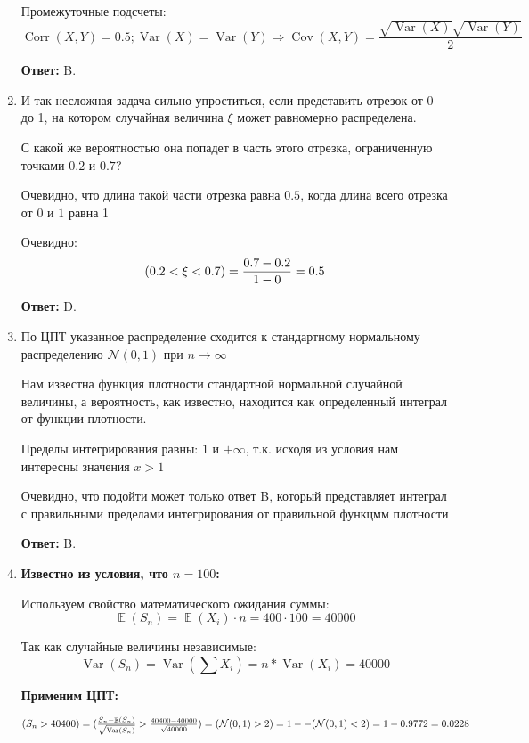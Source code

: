 \documentclass[a4paper]{article} %
\DeclareMathOperator{\Var}{Var}
\DeclareMathOperator{\Cov}{Cov}
\DeclareMathOperator{\Corr}{Corr}
\DeclareMathOperator{\E}{\mathbb{E}}
\let\P\relax
\DeclareMathOperator{\P}{\mathbb{P}}
\newcommand{\cN}{\mathcal{N}}
\begin{document}
\begin{enumerate}
    
    Промежуточные подсчеты: 
    \[\Corr(X,Y) = 0.5; \Var(X) = \Var(Y) \Rightarrow \Cov(X,Y) = \frac{\sqrt{\Var(X)}\sqrt{\Var(Y)}}{2} \]
    
    \textbf{Ответ:} B.
    
    
    \item
    И так несложная задача сильно упроститься, если представить отрезок от 0 до 1, на котором случайная величина $\xi$ может равномерно распределена. 
    
    С какой же вероятностью она попадет в часть этого отрезка, ограниченную точками $0.2$ и $0.7$?
    
    Очевидно, что длина такой части отрезка равна $0.5$, когда длина всего отрезка от $0$ и $1$ равна 1
    
    Очевидно: 
    \[\P(0.2 < \xi < 0.7) = \frac{0.7 - 0.2}{1 - 0} = 0.5 \]
    
    \textbf{Ответ:} D.
    
    
    \item
    По ЦПТ указанное распределение сходится к стандартному нормальному распределению $\cN(0,1)$ при $n \rightarrow \infty$
    
    Нам известна функция плотности стандартной нормальной случайной величины, а вероятность, как известно, находится как определенный интеграл от функции плотности. 
    
    Пределы интегрирования равны: $1$ и ${+\infty}$, т.к. исходя из условия нам интересны значения $x > 1$
    
    Очевидно, что подойти может только ответ B, который представляет интеграл с правильными пределами интегрирования от правильной функцмм плотности
    
    \textbf{Ответ:} B.
    
    
    \item
    \textbf{Известно из условия, что $n = 100$:}
    
    Используем свойство математического ожидания суммы:
    \[\E(S_n) = \E(X_i) \cdot n = 400 \cdot 100 = 40000\]
    
    Так как случайные величины независимые:
    \[\Var(S_n) = \Var(\sum X_i) = n * \Var(X_i) = 40000\]
    
    
    
    \textbf{Применим ЦПТ:}
    
    \begin{math} \P(S_n > 40400) = \P(\frac{S_n - \E(S_n)}{\sqrt{\Var(S_n)}} > \frac{40400 - 40000}{\sqrt{40000}}) = \P(\cN(0,1) > 2) = 1 -  -\P(\cN(0,1) < 2) = 1 - 0.9772 = 0.0228 \end{math}
    

\end{enumerate}
\end{document}
